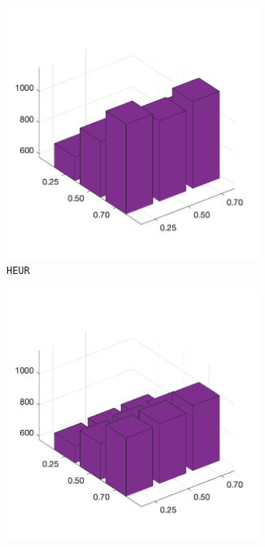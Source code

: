 \begin{figure}[H]
\begin{subfigure}[b]{0.25\textwidth}
    	\end{subfigure}
%
	\begin{subfigure}[b]{0.25\textwidth}
		\centering
		\includegraphics[width=0.9\textwidth]{crossover/min/cross_heuristic_4.png}
		\caption{\texttt{HEUR}}
		\label{fig:x}
    	\end{subfigure}
%
	\begin{subfigure}[b]{0.25\textwidth}
		\centering
		\includegraphics[width=0.9\textwidth]{crossover/min/cross_max_preservative_4.png}

\end{subfigure}
\end{figure}
